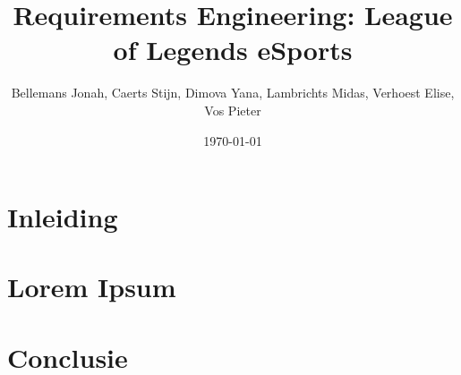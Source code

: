 \documentclass[12pt,a4paper]{article}
\title{Requirements Engineering: League of Legends eSports}
\author{Bellemans Jonah, Caerts Stijn, Dimova Yana, Lambrichts Midas, Verhoest Elise, Vos Pieter}
\date{\today}
\begin{document}
\maketitle
\section{Inleiding}
\section{Lorem Ipsum}
\section{Conclusie}
\end{document}
